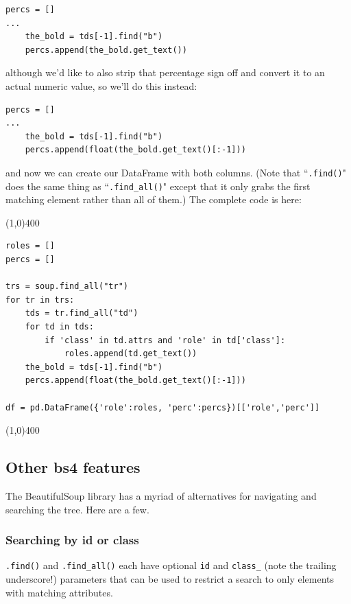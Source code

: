 \documentclass[12pt]{article}
\begin{document}
\begin{Verbatim}[fontsize=\small,samepage=true,frame=none]
percs = []
...
    the_bold = tds[-1].find("b")
    percs.append(the_bold.get_text())
\end{Verbatim}

although we'd like to also strip that percentage sign off and convert it to an
actual numeric value, so we'll do this instead:

\begin{Verbatim}[fontsize=\small,samepage=true,frame=none]
percs = []
...
    the_bold = tds[-1].find("b")
    percs.append(float(the_bold.get_text()[:-1]))
\end{Verbatim}

and now we can create our DataFrame with both columns. (Note that
``\texttt{.find()}" does the same thing as ``\texttt{.find\_all()}" except
that it only grabs the first matching element rather than all of them.) The
complete code is here:

\line(1,0){400}
\footnotesize
\begin{Verbatim}[fontsize=\small,samepage=true,frame=none]
roles = []
percs = []

trs = soup.find_all("tr")
for tr in trs:
    tds = tr.find_all("td")
    for td in tds:
        if 'class' in td.attrs and 'role' in td['class']:
            roles.append(td.get_text())
    the_bold = tds[-1].find("b")
    percs.append(float(the_bold.get_text()[:-1]))

df = pd.DataFrame({'role':roles, 'perc':percs})[['role','perc']]
\end{Verbatim}
\normalsize
\line(1,0){400}

\subsection{Other bs4 features}

The BeautifulSoup library has a myriad of alternatives for navigating and
searching the tree. Here are a few.

\subsubsection{Searching by id or class}

\texttt{.find()} and \texttt{.find\_all()} each have optional \texttt{id} and
\texttt{class\_} (note the trailing underscore!) parameters that can be used
to restrict a search to only elements with matching attributes.
\end{document}
